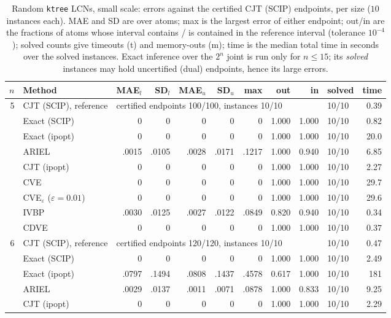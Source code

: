 \begin{table}[htbp]
\centering
\scriptsize
\caption{Random \texttt{ktree} LCNs, small scale: errors against the certified CJT (SCIP) endpoints, per size ($10$ instances each). MAE and SD are over atoms; max is the largest error of either endpoint; out/in are the fractions of atoms whose interval contains / is contained in the reference interval (tolerance $10^{-4}$); solved counts give timeouts (t) and memory-outs (m); time is the median total time in seconds over the solved instances. Exact inference over the $2^n$ joint is run only for $n \le 15$; its \emph{solved} instances may hold uncertified (dual) endpoints, hence its large errors.}
\label{tab:full-ktree-small}
\begin{tabular}{rlrrrrrrrlr}
\toprule
$n$ & Method & MAE$_l$ & SD$_l$ & MAE$_u$ & SD$_u$ & max & out & in & solved & time \\
\midrule
5 & CJT (SCIP), reference & \multicolumn{7}{l}{certified endpoints 100/100, instances 10/10} & 10/10 & 0.39 \\
 & Exact (SCIP) & 0 & 0 & 0 & 0 & 0 & 1.000 & 1.000 & 10/10 & 0.82 \\
 & Exact (ipopt) & 0 & 0 & 0 & 0 & 0 & 1.000 & 1.000 & 10/10 & 20.0 \\
 & ARIEL & .0015 & .0105 & .0028 & .0171 & .1217 & 1.000 & 0.940 & 10/10 & 6.85 \\
 & CJT (ipopt) & 0 & 0 & 0 & 0 & 0 & 1.000 & 1.000 & 10/10 & 2.27 \\
 & CVE & 0 & 0 & 0 & 0 & 0 & 1.000 & 1.000 & 10/10 & 29.7 \\
 & CVE$_\varepsilon$ ($\varepsilon{=}0.01$) & 0 & 0 & 0 & 0 & 0 & 1.000 & 1.000 & 10/10 & 29.6 \\
 & IVBP & .0030 & .0125 & .0027 & .0122 & .0849 & 0.820 & 0.940 & 10/10 & 0.34 \\
 & CDVE & 0 & 0 & 0 & 0 & 0 & 1.000 & 1.000 & 10/10 & 0.37 \\
\midrule
6 & CJT (SCIP), reference & \multicolumn{7}{l}{certified endpoints 120/120, instances 10/10} & 10/10 & 0.47 \\
 & Exact (SCIP) & 0 & 0 & 0 & 0 & 0 & 1.000 & 1.000 & 10/10 & 2.49 \\
 & Exact (ipopt) & .0797 & .1494 & .0808 & .1437 & .4578 & 0.617 & 1.000 & 10/10 & 181 \\
 & ARIEL & .0029 & .0137 & .0011 & .0071 & .0878 & 1.000 & 0.833 & 10/10 & 9.25 \\
 & CJT (ipopt) & 0 & 0 & 0 & 0 & 0 & 1.000 & 1.000 & 10/10 & 2.29 \\

\end{tabular}
\end{table}
